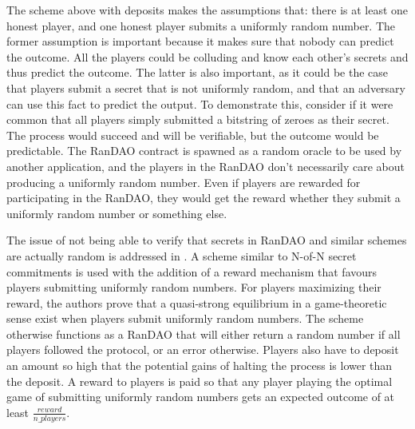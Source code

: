 The scheme above with deposits makes the assumptions that: there is at least one honest player, and one honest player submits a uniformly random number. The former assumption is important because it makes sure that nobody can predict the outcome. All the players could be colluding and know each other's secrets and thus predict the outcome. The latter is also important, as it could be the case that players submit a secret that is not uniformly random, and that an adversary can use this fact to predict the output. To demonstrate this, consider if it were common that all players simply submitted a bitstring of zeroes as their secret. The process would succeed and will be verifiable, but the outcome would be predictable. The RanDAO contract is spawned as a random oracle to be used by another application, and the players in the RanDAO don't necessarily care about producing a uniformly random number. Even if players are rewarded for participating in the RanDAO, they would get the reward whether they submit a uniformly random number or something else.

The issue of not being able to verify that secrets in RanDAO and similar schemes are actually random is addressed in \cite{chatterjee_probabilistic_2019}. A scheme similar to N-of-N secret commitments is used with the addition of a reward mechanism that favours players submitting uniformly random numbers. For players maximizing their reward, the authors prove that a quasi-strong equilibrium in a game-theoretic sense exist when players submit uniformly random numbers. The scheme otherwise functions as a RanDAO that will either return a random number if all players followed the protocol, or an error otherwise. Players also have to deposit an amount so high that the potential gains of halting the process is lower than the deposit. A reward to players is paid so that any player playing the optimal game of submitting uniformly random numbers gets an expected outcome of at least $\frac{reward}{n\_players}$. 

